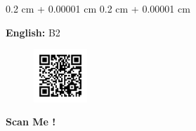 \documentclass[10pt, letterpaper]{article}
\newenvironment{onecolentry}{
    \begin{adjustwidth}{
        0.2 cm + 0.00001 cm
    }{
        0.2 cm + 0.00001 cm
    }
}{
    \end{adjustwidth}
} %
\begin{document}
        \begin{onecolentry}
            \textbf{English:} B2
        \end{onecolentry}
        \vspace{0.2 cm}



    \begin{figure}[th]
        \centering
        \includegraphics[width=2cm, height=2cm]{qr_code_cv.png}
    \end{figure}
    \begin{center}
            \textbf{Scan Me !}
    \end{center}
\end{document}
